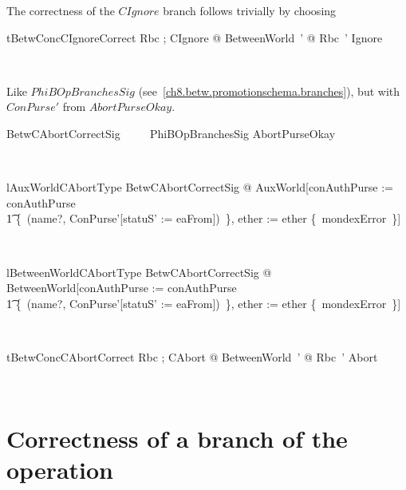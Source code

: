 The correctness of the $CIgnore$ branch follows trivially by
choosing

\begin{LNewThm}
\begin{theorem}{tBetwConcCIgnoreCorrect}
    \forall Rbc ; CIgnore @ \exists BetweenWorld~' @ Rbc~' \land Ignore
\end{theorem}~\end{LNewThm}

Like $PhiBOpBranchesSig$
(see~\ref{ch8.betw.promotionschema.branches}), but with $ConPurse'$
from $AbortPurseOkay$.
%
\begin{LNewSDef}
\begin{zed}
    BetwCAbortCorrectSig ~~~~ PhiBOpBranchesSig \land AbortPurseOkay
\end{zed}~\end{LNewSDef}

\begin{LNewLemma}
\begin{theorem}{lAuxWorldCAbortType}
    \forall BetwCAbortCorrectSig @ AuxWorld[conAuthPurse := conAuthPurse \oplus \\
        \t1 \{~(name?, \theta ConPurse'[statuS' := eaFrom])~\}, ether := ether \cup \{~mondexError~\}]
\end{theorem}~\end{LNewLemma}

\begin{LNewLemma}
\begin{theorem}{lBetweenWorldCAbortType}
    \forall BetwCAbortCorrectSig @ BetweenWorld[conAuthPurse := conAuthPurse \oplus \\
        \t1 \{~(name?, \theta ConPurse'[statuS' := eaFrom])~\}, ether := ether \cup \{~mondexError~\}]
\end{theorem}~\end{LNewLemma}

\begin{LNewThm}
\begin{theorem}{tBetwConcCAbortCorrect}
    \forall Rbc ; CAbort @ \exists BetweenWorld~' @ Rbc~' \land Abort
\end{theorem}~\end{LNewThm}


\section{Correctness of a branch of the operation}\label{ch28.bc-ignore-okay}

